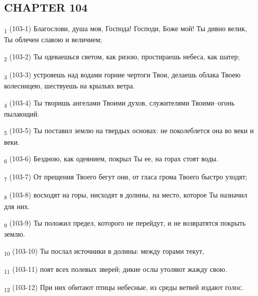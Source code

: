 \subsection{CHAPTER 104}
\begin{tcolorbox}
\textsubscript{1} (103-1) Благослови, душа моя, Господа! Господи, Боже мой! Ты дивно велик, Ты облечен славою и величием;
\end{tcolorbox}
\begin{tcolorbox}
\textsubscript{2} (103-2) Ты одеваешься светом, как ризою, простираешь небеса, как шатер;
\end{tcolorbox}
\begin{tcolorbox}
\textsubscript{3} (103-3) устрояешь над водами горние чертоги Твои, делаешь облака Твоею колесницею, шествуешь на крыльях ветра.
\end{tcolorbox}
\begin{tcolorbox}
\textsubscript{4} (103-4) Ты творишь ангелами Твоими духов, служителями Твоими--огонь пылающий.
\end{tcolorbox}
\begin{tcolorbox}
\textsubscript{5} (103-5) Ты поставил землю на твердых основах: не поколеблется она во веки и веки.
\end{tcolorbox}
\begin{tcolorbox}
\textsubscript{6} (103-6) Бездною, как одеянием, покрыл Ты ее, на горах стоят воды.
\end{tcolorbox}
\begin{tcolorbox}
\textsubscript{7} (103-7) От прещения Твоего бегут они, от гласа грома Твоего быстро уходят;
\end{tcolorbox}
\begin{tcolorbox}
\textsubscript{8} (103-8) восходят на горы, нисходят в долины, на место, которое Ты назначил для них.
\end{tcolorbox}
\begin{tcolorbox}
\textsubscript{9} (103-9) Ты положил предел, которого не перейдут, и не возвратятся покрыть землю.
\end{tcolorbox}
\begin{tcolorbox}
\textsubscript{10} (103-10) Ты послал источники в долины: между горами текут,
\end{tcolorbox}
\begin{tcolorbox}
\textsubscript{11} (103-11) поят всех полевых зверей; дикие ослы утоляют жажду свою.
\end{tcolorbox}
\begin{tcolorbox}
\textsubscript{12} (103-12) При них обитают птицы небесные, из среды ветвей издают голос.
\end{tcolorbox}
